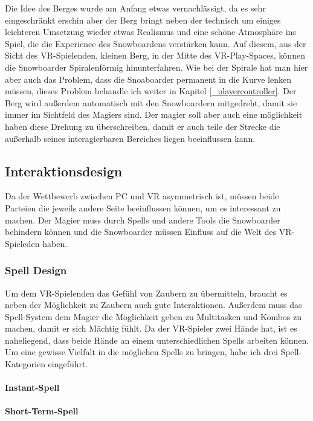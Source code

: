 Die Idee des Berges wurde am Anfang etwas vernachlässigt, da es sehr eingeschränkt erschin aber der Berg bringt neben der technisch um einiges leichteren Umsetzung wieder etwas Realismus und eine schöne Atmosphäre ins Spiel, die die Experience des Snowboardens verstärken kann. Auf diesem, aus der Sicht des VR-Spielenden, kleinen Berg, in der Mitte des VR-Play-Spaces, können die Snowboarder Spiralenförmig hinunterfahren. Wie bei der Spirale hat man hier aber auch das Problem, dass die Snoaboarder permanent in die Kurve lenken müssen, dieses Problem behandle ich weiter in Kapitel \ref{_playercontroller}. Der Berg wird außerdem automatisch mit den Snowboardern mitgedreht, damit sie immer im Sichtfeld des Magiers sind. Der magier soll aber auch eine möglichkeit haben diese Drehung zu überschreiben, damit er auch teile der Strecke die außerhalb seines interagierbaren Bereiches liegen beeinflussen kann.

\subsection{Interaktionsdesign}

Da der Wettbewerb zwischen PC und VR asymmetrisch ist, müssen beide Parteien die jeweils andere Seite beeinflussen können, um es interessant zu machen. Der Magier muss durch Spells und andere Tools die Snowboarder behindern können und die Snowboarder müssen Einfluss auf die Welt des VR-Spieleden haben.

\subsubsection{Spell Design\label{_spell_design}}

Um dem VR-Spielenden das Gefühl von Zaubern zu übermitteln, braucht es neben der Möglichkeit zu Zaubern auch gute Interaktionen. Außerdem muss das Spell-System dem Magier die Möglichkeit geben zu Multitasken und Kombos zu machen, damit er sich Mächtig fühlt. Da der VR-Spieler zwei Hände hat, ist es naheliegend, dass beide Hände an einem unterschiedlichen Spells arbeiten können. Um eine gewisse Vielfalt in die möglichen Spells zu bringen, habe ich drei Spell-Kategorien eingeführt.

\paragraph{Instant-Spell}
\paragraph{Short-Term-Spell}
